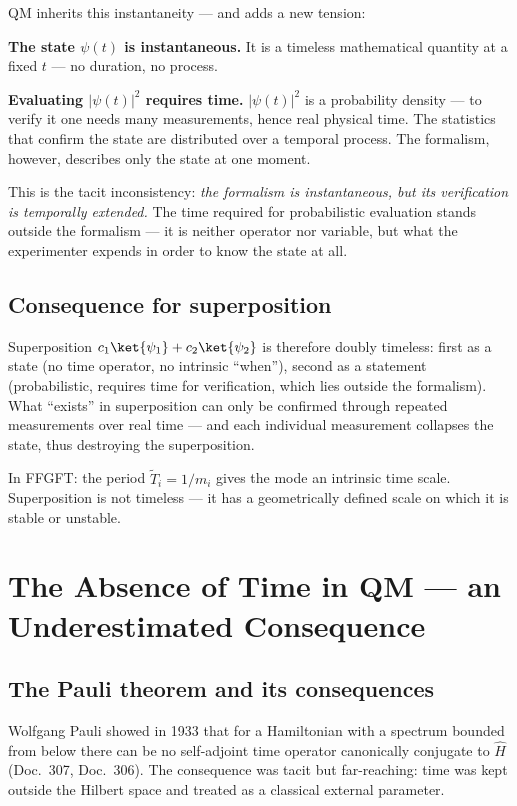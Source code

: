 QM inherits this instantaneity — and adds a new tension:

\textbf{The state $\psi(t)$ is instantaneous.} It is a timeless
mathematical quantity at a fixed $t$ — no duration, no process.

\textbf{Evaluating $|\psi(t)|^2$ requires time.}
$|\psi(t)|^2$ is a probability density — to verify it one needs
many measurements, hence real physical time. The statistics that
confirm the state are distributed over a temporal process. The
formalism, however, describes only the state at one moment.

This is the tacit inconsistency: \emph{the formalism is
instantaneous, but its verification is temporally extended.}
The time required for probabilistic evaluation stands outside the
formalism — it is neither operator nor variable, but what the
experimenter expends in order to know the state at all.

\subsection{Consequence for superposition}

Superposition $c_1\ket{\psi_1}+c_2\ket{\psi_2}$ is therefore
doubly timeless: first as a state (no time operator, no intrinsic
``when''), second as a statement (probabilistic, requires time for
verification, which lies outside the formalism). What ``exists'' in
superposition can only be confirmed through repeated measurements
over real time — and each individual measurement collapses the
state, thus destroying the superposition.

In FFGFT: the period $\tilde{T}_i=1/m_i$ gives the mode an
intrinsic time scale. Superposition is not timeless — it has a
geometrically defined scale on which it is stable or unstable.

\section{The Absence of Time in QM — an Underestimated Consequence}

\subsection{The Pauli theorem and its consequences}

Wolfgang Pauli showed in 1933 that for a Hamiltonian with a spectrum
bounded from below there can be no self-adjoint time operator
canonically conjugate to $\hat{H}$ (Doc.~307, Doc.~306). The
consequence was tacit but far-reaching: time was kept outside the
Hilbert space and treated as a classical external parameter.

